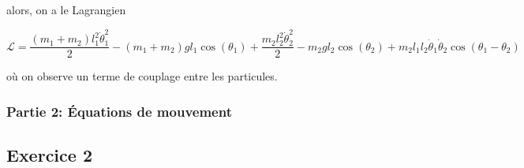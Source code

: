 \documentclass[french]{article}
\begin{document}
	alors, on a le Lagrangien
	
	\begin{equation}
		\mathcal{L} = \frac{(m_1+m_2)l_1^2 \dot{\theta}_1^2}{2} - (m_1+m_2)gl_1\cos(\theta_1) + \frac{m_2 l_2^2 \dot{\theta}_2^2}{2} - m_2gl_2\cos(\theta_2) + m_2 l_1 l_2 \dot{\theta}_1\dot{\theta}_2\cos(\theta_1 - \theta_2)
	\end{equation}
	
	où on observe un terme de couplage entre les particules.
	
	\subsubsection*{Partie 2: Équations de mouvement}
	
	
	\subsection*{Exercice 2}
\end{document}
